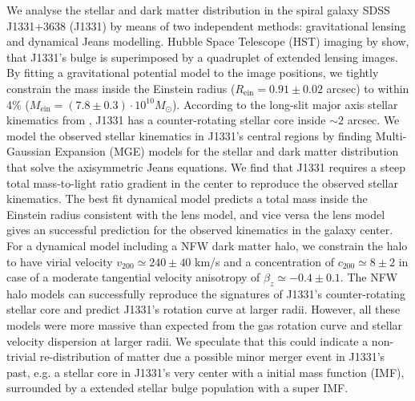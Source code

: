 We analyse the stellar and dark matter distribution in the spiral galaxy SDSS J1331+3638 (J1331) by means of two independent methods: gravitational lensing and dynamical Jeans modelling. Hubble Space Telescope (HST) imaging by \citet{SWELLSI} show, that J1331's bulge is superimposed by a quadruplet of extended lensing images. By fitting a gravitational potential model to the image positions, we tightly constrain the mass inside the Einstein radius ($R_\text{ein}=0.91\pm0.02$ arcsec) to within 4\% ($M_\text{ein} = (7.8\pm0.3) \cdot 10^{10} M_\odot$). According to the long-slit major axis stellar kinematics from \citet{SWELLSV}, J1331 has a counter-rotating stellar core inside $\sim 2$ arcsec. We model the observed stellar kinematics in J1331's central regions by finding Multi-Gaussian Expansion (MGE) models for the stellar and dark matter distribution that solve the axisymmetric Jeans equations. We find that J1331 requires a steep total mass-to-light ratio gradient in the center to reproduce the observed stellar kinematics. The best fit dynamical model predicts a total mass inside the Einstein radius consistent with the lens model, and vice versa the lens model gives an successful prediction for the observed kinematics in the galaxy center. For a dynamical model including a NFW dark matter halo,  we constrain the halo to have virial velocity $v_{200} \simeq 240 \pm 40$ km/s and a concentration of $c_{200} \simeq 8 \pm 2$ in case of a moderate tangential velocity anisotropy of $\beta_z \simeq −0.4 \pm 0.1$. The NFW halo models can successfully reproduce the signatures of J1331's counter-rotating stellar core and predict J1331's rotation curve at larger radii. However, all these models were more massive than expected from the gas rotation curve and stellar velocity dispersion at larger radii. We speculate that this could indicate a non-trivial re-distribution of matter due a possible minor merger event in J1331's past, e.g. a stellar core in J1331's very center with a \citet{Chabrier2003} initial mass function (IMF), surrounded by a extended stellar bulge population with a super \citet{Salpeter1955} IMF.